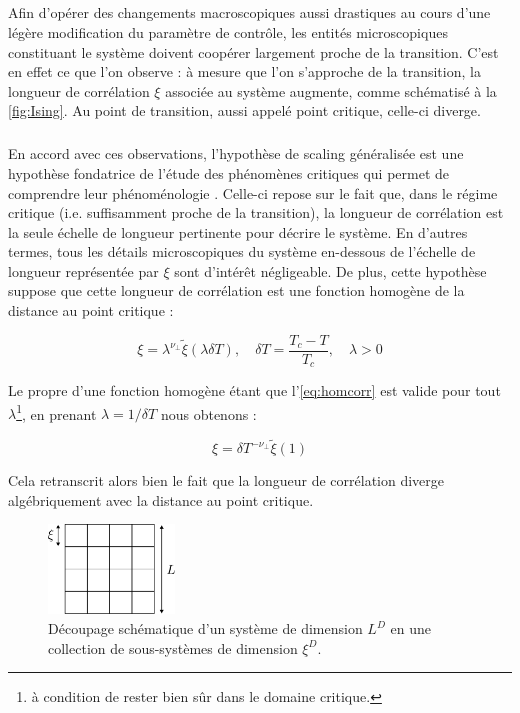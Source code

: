 \subparagraph{}Afin d'opérer des changements macroscopiques aussi drastiques au cours d'une légère modification du paramètre de contrôle, les entités microscopiques constituant le système doivent coopérer largement proche de la transition. C'est en effet ce que l'on observe : à mesure que l'on s'approche de la transition, la longueur de corrélation $\xi$ associée au système augmente, comme schématisé à la \autoref{fig:Ising}. Au point de transition, aussi appelé point critique, celle-ci diverge.

\subparagraph{}En accord avec ces observations, l'hypothèse de scaling généralisée est une hypothèse fondatrice de l'étude des phénomènes critiques qui permet de comprendre leur phénoménologie \cite{kardar_statistical_2007}. Celle-ci repose sur le fait que, dans le régime critique (i.e. suffisamment proche de la transition), la longueur de corrélation est la seule échelle de longueur pertinente pour décrire le système. En d'autres termes, tous les détails microscopiques du système en-dessous de l'échelle de longueur représentée par $\xi$ sont d'intérêt négligeable. De plus, cette hypothèse suppose que cette longueur de corrélation est une fonction homogène de la distance au point critique :

\begin{equation}
    \xi = \lambda^{\nu_\perp} \tilde{\xi}(\lambda \delta T), \quad \delta T = \frac{T_c-T}{T_c}, \quad \lambda>0
    \label{eq:homcorr}
\end{equation}

\noindent Le propre d'une fonction homogène étant  que l'\autoref{eq:homcorr} est valide pour tout $\lambda$\footnote{à condition de rester bien sûr dans le domaine critique.}, en prenant $\lambda = 1/\delta T$ nous obtenons :

\begin{equation}
    \xi = \delta T^{-\nu_\perp}\tilde{\xi}(1)
\end{equation}

\noindent Cela retranscrit alors bien le fait que la longueur de corrélation diverge algébriquement avec la distance au point critique.

\begin{figure}[h]
	\centering
	\includegraphics[width=0.3\textwidth]{Chapitre1/Figures/PhenomenesCritiques/decoupageXI.pdf}
	\caption{Découpage schématique d'un système de dimension $L^D$ en une collection de sous-systèmes de dimension $\xi^D$.}
	\label{fig:DecoupageXi}
\end{figure}

